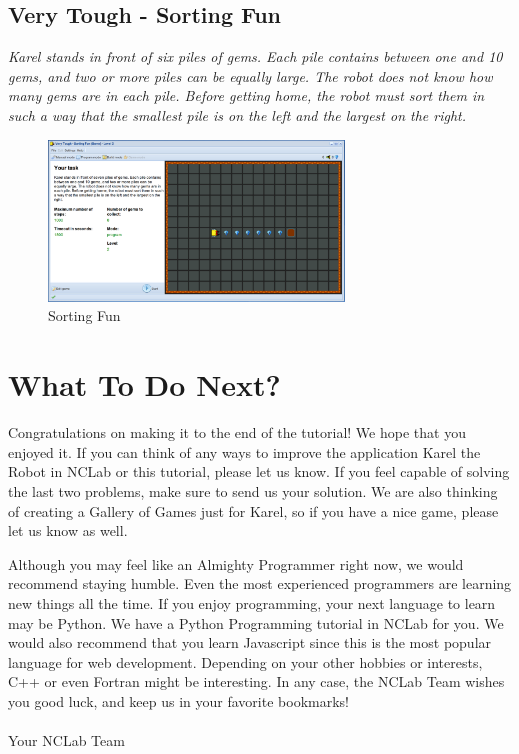 \documentclass[article,A4,12pt]{llncs}
\begin{document}
\newpage
\subsection{Very Tough - Sorting Fun}

{\em Karel stands in front of six piles of gems. Each pile contains between one and 10 gems, and two or more piles can be equally large. The robot does not know how many gems are in each pile. Before getting home, the robot must sort them in such a way that the smallest pile is on the left and the largest on the right. }

\begin{figure}[!ht]
\begin{center}
\includegraphics[width=0.7\textwidth]{img/game-sorting.png}
\end{center}
\vspace{-4mm}
\caption{Sorting Fun}
\label{fig:sorting}
\end{figure}
\noindent


\section{What To Do Next?}

Congratulations on making it to the end of the tutorial! We hope that you
enjoyed it. If you can think of any ways to improve the application 
Karel the Robot in NCLab or this tutorial, please let us know. If you 
feel capable of solving the last two problems, make sure to send us your 
solution. We are also thinking of creating a Gallery of Games just for Karel,
so if you have a nice game, please let us know as well. 

Although you may feel like an Almighty Programmer right now, we would
recommend staying humble. Even the most experienced programmers are
learning new things all the time. If you enjoy programming, your next 
language to learn may be Python. We have a Python Programming tutorial
in NCLab for you. We would also recommend that you learn Javascript since this 
is the most popular language for web development. Depending on your 
other hobbies or interests, C++ or even Fortran might be interesting. 
In any case, the NCLab Team wishes you good luck, and keep us in your 
favorite bookmarks!\\
\\
\hbox{} \hfill Your NCLab Team
\end{document}
